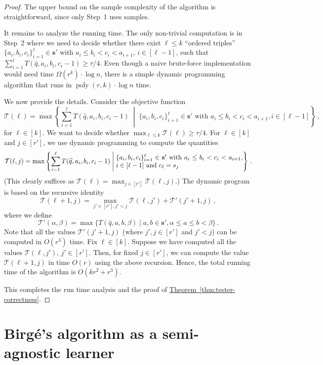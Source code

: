 \documentclass[10pt]{article}
\theoremstyle{definition}
\numberwithin{equation}{section}
\newcommand{\expref}[2]{\texorpdfstring{\hyperref[#2]{#1~\ref{#2}}}{#1~\ref{#2}}}
\newcommand{\poly}{\operatorname{poly}}
\newcommand{\wh}[1]{{\widehat{#1}}}
\begin{document}
\begin{proof}
The upper bound on the sample complexity of the algorithm is straightforward, since
only Step~1 uses samples. 

 {It remains to analyze the running time. The only non-trivial computation is in Step~2 where we need to decide whether 
there exist $\ell \le k$ ``ordered triples'' $\{a_i, b_i, c_i\}_{i=1}^{\ell} \in  \mathbf{s}'$ with $a_i \le b_i < c_i < a_{i+1}$, $i \in [\ell-1]$,
such that $\sum_{i=1}^{\ell} T(\wh{q}, a_i, b_i, c_i-1) \ge \tau/4$.
Even though a naive brute-force implementation would need time $\Omega(r^k) \cdot \log n$, 
there is a simple dynamic programming algorithm that runs in $\poly(r, k) \cdot \log n$
time.

We now provide the details. Consider the objective function
$$\mathcal{T}(\ell) = \max \left\{ \sum_{i=1}^{\ell} T(\wh{q}, a_i, b_i, c_i-1) \;\middle|\; 
\{a_i, b_i, c_i\}_{i=1}^{\ell} \in \mathbf{s}'  \textrm{ with } a_i \le b_i < c_i < a_{i+1}, i \in [\ell-1] \right\}\,,$$
for $\ell \in [k]$. We want to decide whether $\max_{\ell \le k}\mathcal{T}(\ell) \ge \tau/4$. 
%
For $\ell \in [k]$ and $j \in [r']$, we use dynamic programming to compute the quantities 
$$\mathcal{T}(\ell, j) = \max \left\{ \sum_{i=1}^{\ell} T(\wh{q}, a_i,
  b_i, c_i-1) \;\middle|\; \parbox{68mm}{$\{a_i, b_i,
      c_i\}_{i=1}^{\ell} \in \mathbf{s}'$ with $a_i \le b_i < c_i < a_{i+1}$, $i \in [\ell-1]$ and $c_{\ell} = s_j$} \right\}\,.$$
(This clearly suffices as $\mathcal{T}(\ell) = \max_{j \in [r']} \mathcal{T}(\ell, j)$.)
The dynamic program is based on the recursive identity 
$$\mathcal{T}(\ell+1, j) = \max_{j' \in [r'],  j'<j}\mathcal{T}(\ell, j') +  \mathcal{T}'(j'+1, j)\,,$$
where we define 
\[
\mathcal{T}'(\alpha,\beta)  =  \max \{ T(\wh{q}, a, b, \beta) \mid  a,b \in \mathbf{s}', 
\alpha \leq a \leq b < \beta \}\,.
\]
Note that all the values $\mathcal{T}'(j'+1,j)$ (where $j',j \in [r']$ and $j'<j$) can be computed in $O(r^3)$ time. Fix $\ell \in [k]$. Suppose we have computed all
the values $\mathcal{T}(\ell, j')$, $j' \in [r']$. Then, for fixed $j \in [r']$, we can compute the value $\mathcal{T}(\ell+1, j)$ in time $O(r)$ 
using the above recursion. Hence, the total running time of the algorithm is $O(kr^2+r^3)$.
}
\noindent This completes the run time analysis and the proof of \expref{Theorem}{thm:tester-correctness}.
\end{proof}

\appendix

%

\section{Birg{\'e}'s algorithm as a semi-agnostic learner}
\label{sec:birge-agnostic}
\end{document}
